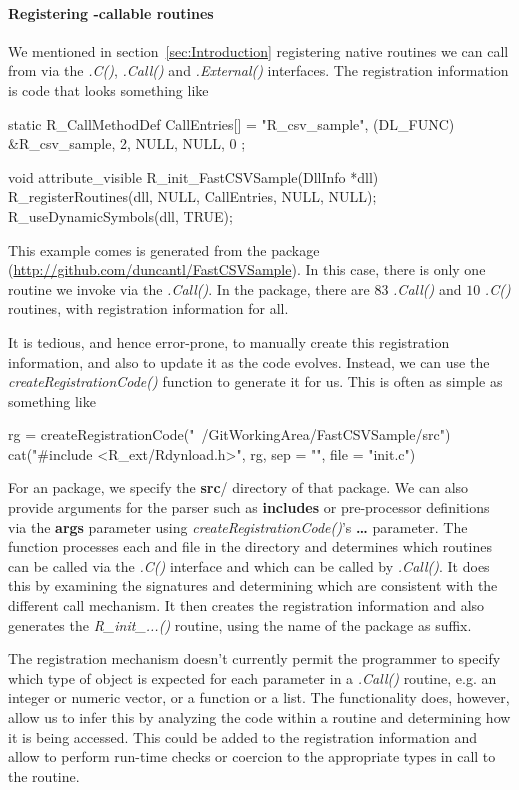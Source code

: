 \documentclass[article]{jss}
\def\C{\proglang{C}}
\def\Cpp{\proglang{C$++$}}
\def\R{\proglang{R}}
\def\Rpkg#1{\pkg{#1}}
\def\Rfunc#1{\textsl{#1()}}
\def\Cfunc#1{\textit{#1()}}
\def\dir#1{\textbf{#1}/}
\def\Rarg#1{\textbf{#1}}
\begin{document}
\paragraph{Registering \R-callable routines}
We mentioned in section~\ref{sec:Introduction} registering native
routines we can call from \R{} via the \Rfunc{.C}, \Rfunc{.Call} and
\Rfunc{.External} interfaces.
The registration information is \C{} code that looks something like
\begin{CCode}
static R_CallMethodDef CallEntries[] = {
     {"R_csv_sample", (DL_FUNC) &R_csv_sample, 2},
     {NULL, NULL, 0}
};

void attribute_visible R_init_FastCSVSample(DllInfo *dll)
{
   R_registerRoutines(dll, NULL, CallEntries, NULL, NULL);
   R_useDynamicSymbols(dll, TRUE);
}  
\end{CCode}
This example comes is generated from the \Rpkg{FastCSVSample} package
(\url{http://github.com/duncantl/FastCSVSample}). In this case, there
is only one \C{} routine we invoke via the \Rfunc{.Call}.  In the
\Rpkg{stats} package, there are $83$ \Rfunc{.Call} and $10$ \Rfunc{.C}
routines, with registration information for all. 

It is tedious, and hence error-prone, to manually create this
registration information, and also to update it as the code evolves.
Instead, we can use the \Rfunc{createRegistrationCode} function to
generate it for us.  This is often as simple as something like
\begin{RCode}
rg = createRegistrationCode("~/GitWorkingArea/FastCSVSample/src")  
cat("#include <R_ext/Rdynload.h>",  rg, sep = "\n", file = "init.c")
\end{RCode}
For an \R{} package, we specify the \dir{src} directory of that
package.  We can also provide arguments for the parser such as
\Rarg{includes} or pre-processor definitions via the \Rarg{args} parameter
using \Rfunc{createRegistrationCode}'s \Rarg{\dots} parameter.  The function processes each \C{} and \Cpp{}
file in the directory and determines which routines can be called via
the \Rfunc{.C} interface and which can be called by \Rfunc{.Call}.  It
does this by examining the signatures and determining which are
consistent with the different call mechanism.  It then creates the
registration information and also generates the \Cfunc{R_init_...}
routine, using the name of the package as suffix.

The \R{} registration mechanism doesn't currently permit the
programmer to specify which type of \R{} object is expected for each
parameter in a \Rfunc{.Call} routine, e.g. an integer or numeric
vector, or a function or a list.  The \Rpkg{RCIndex} functionality
does, however, allow us to infer this by analyzing the code within a
routine and determining how it is being accessed.  This could be added
to the registration information and allow \R{} to perform run-time
checks or coercion to the appropriate types in call to the routine.
\end{document}
